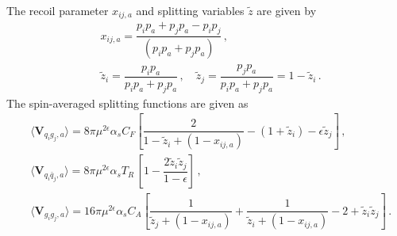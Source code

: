 \documentclass[main.tex]{subfiles}
\begin{document}
        The recoil parameter $x_{ij,a}$ and splitting variables $\tilde{z}$ are given by
        \begin{equation}\label{eqn:x_ija}
        \begin{split}
                &x_{ij,a} = \dfrac{p_{i}p_{a} + p_{j}p_{a} - p_{i}p_{j}}{(p_{i}p_{a} + p_{j}p_{a})} \, , \\
                &\tilde{z}_{i} = \dfrac{p_{i}p_{a}}{p_{i}p_{a} + p_{j}p_{a}} \, , \quad \tilde{z}_{j} = \dfrac{p_{j}p_{a}}{p_{i}p_{a} + p_{j}p_{a}} = 1 - \tilde{z}_{i} \, .
            \end{split}
        \end{equation}
        The spin-averaged splitting functions are given as
        \begin{align}\label{eqn:FI_V_aij}
            &\langle \boldsymbol{V}_{q_{i}g_{j},a} \rangle = 8\pi \mu^{2\epsilon}\alpha_{s} C_{F} \left[\dfrac{2}{1 - \tilde{z}_{i} + (1-x_{ij,a})} - (1+\tilde{z}_{i}) - \epsilon \tilde{z}_{j} \right] \, , \nonumber \\
            &\langle \boldsymbol{V}_{q_{i}\bar{q}_{j},a} \rangle = 8\pi \mu^{2\epsilon}\alpha_{s} T_{R} \, \left[1-\dfrac{2\tilde{z}_{i}\tilde{z}_{j}}{1-\epsilon}\right] \, , \nonumber \\
            &\langle \boldsymbol{V}_{g_{i}g_{j},a} \rangle = 16\pi \mu^{2\epsilon} \alpha_{s} C_{A} \left[\dfrac{1}{\tilde{z}_{j} + (1-x_{ij,a})} + \dfrac{1}{\tilde{z}_{i} + (1-x_{ij,a})} - 2 + \tilde{z}_{i}\tilde{z}_{j}\right] \, .
        \end{align}
\end{document}

